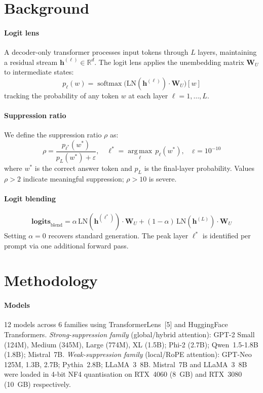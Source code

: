 \documentclass{article}
\begin{document}
\section{Background}

\paragraph{Logit lens}
A decoder-only transformer processes input tokens through $L$ layers, maintaining
a residual stream $\mathbf{h}^{(\ell)}\in\mathbb{R}^d$.
The logit lens applies the unembedding matrix $\mathbf{W}_U$ to intermediate states:
\begin{equation}
p_\ell(w) = \operatorname{softmax}\!\bigl(
  \mathrm{LN}(\mathbf{h}^{(\ell)})\cdot\mathbf{W}_U\bigr)[w]
\label{eq:lens}
\end{equation}
tracking the probability of any token $w$ at each layer $\ell=1,\ldots,L$.

\paragraph{Suppression ratio}
We define the suppression ratio $\rho$ as:
\begin{equation}
\rho = \frac{p_{\ell^*}(w^*)}{p_L(w^*)+\varepsilon},\quad
\ell^* = \operatorname*{arg\,max}_\ell\,p_\ell(w^*),\quad \varepsilon=10^{-10}
\label{eq:rho}
\end{equation}
where $w^*$ is the correct answer token and $p_L$ is the final-layer probability.
Values $\rho>2$ indicate meaningful suppression; $\rho>10$ is severe.

\paragraph{Logit blending}
\begin{equation}
\mathbf{logits}_{\mathrm{blend}}
  = \alpha\,\mathrm{LN}(\mathbf{h}^{(\ell^*)})\cdot\mathbf{W}_U
  + (1-\alpha)\,\mathrm{LN}(\mathbf{h}^{(L)})\cdot\mathbf{W}_U
\label{eq:blend}
\end{equation}
Setting $\alpha=0$ recovers standard generation.
The peak layer $\ell^*$ is identified per prompt via one additional forward pass.

\section{Methodology}

\paragraph{Models}
12 models across 6 families using TransformerLens~[5] and HuggingFace
Transformers.
\emph{Strong-suppression family} (global/hybrid attention):
GPT-2 Small (124M), Medium (345M), Large (774M), XL (1.5B);
Phi-2 (2.7B); Qwen~1.5-1.8B (1.8B); Mistral~7B.
\emph{Weak-suppression family} (local/RoPE attention):
GPT-Neo 125M, 1.3B, 2.7B; Pythia~2.8B; LLaMA~3~8B.
Mistral~7B and LLaMA~3~8B were loaded in 4-bit NF4 quantisation on
RTX~4060 (8~GB) and RTX~3080 (10~GB) respectively.
\end{document}
